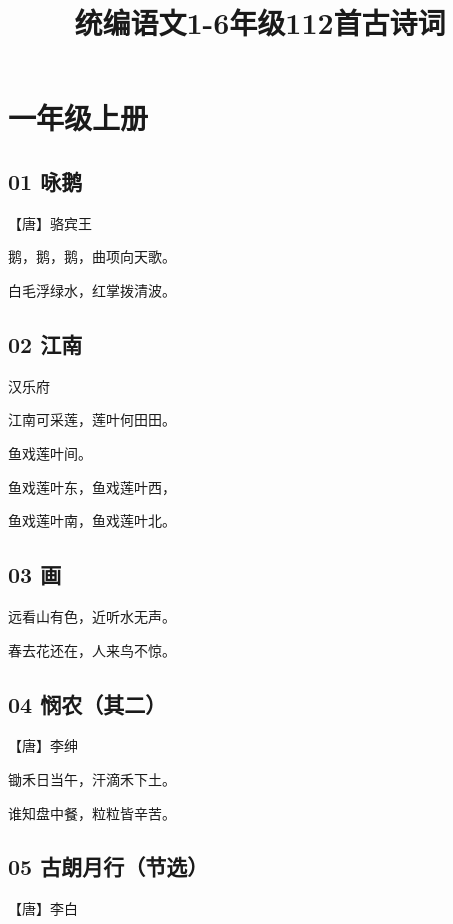 \documentclass[a6paper, 12pt]{article}
\begin{document}
\title{统编语文1-6年级112首古诗词}
\date{}

\maketitle


\centering

\section*{一年级上册}

\subsection*{01 咏鹅}

【唐】骆宾王

鹅，鹅，鹅，曲项向天歌。

白毛浮绿水，红掌拨清波。

\subsection*{02 江南}

汉乐府

江南可采莲，莲叶何田田。

鱼戏莲叶间。

鱼戏莲叶东，鱼戏莲叶西，

鱼戏莲叶南，鱼戏莲叶北。

\subsection*{03 画}

远看山有色，近听水无声。

春去花还在，人来鸟不惊。

\subsection*{04 悯农（其二）}

【唐】李绅

锄禾日当午，汗滴禾下土。

谁知盘中餐，粒粒皆辛苦。

\subsection*{05 古朗月行（节选）}

【唐】李白
\end{document}
